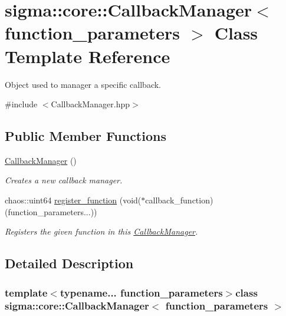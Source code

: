 \hypertarget{classsigma_1_1core_1_1_callback_manager}{\section{sigma\-:\-:core\-:\-:Callback\-Manager$<$ function\-\_\-parameters $>$ Class Template Reference}
\label{classsigma_1_1core_1_1_callback_manager}
}


Object used to manager a specific callback.  




{\ttfamily \#include $<$Callback\-Manager.\-hpp$>$}

\subsection*{Public Member Functions}
\begin{DoxyCompactItemize}
\item 
\hypertarget{classsigma_1_1core_1_1_callback_manager_addca93c8df2c8e419fd6a24bd00b215e}{\hyperlink{classsigma_1_1core_1_1_callback_manager_addca93c8df2c8e419fd6a24bd00b215e}{Callback\-Manager} ()}\label{classsigma_1_1core_1_1_callback_manager_addca93c8df2c8e419fd6a24bd00b215e}

\begin{DoxyCompactList}\small\item\em Creates a new callback manager. \end{DoxyCompactList}\item 
chaos\-::uint64 \hyperlink{classsigma_1_1core_1_1_callback_manager_a7dbb06902d49789afc466a3ecbacbfe2}{register\-\_\-function} (void($\ast$callback\-\_\-function)(function\-\_\-parameters...))
\begin{DoxyCompactList}\small\item\em Registers the given function in this \hyperlink{classsigma_1_1core_1_1_callback_manager}{Callback\-Manager}. \end{DoxyCompactList}\end{DoxyCompactItemize}


\subsection{Detailed Description}
\subsubsection*{template$<$typename... function\-\_\-parameters$>$class sigma\-::core\-::\-Callback\-Manager$<$ function\-\_\-parameters $>$}

